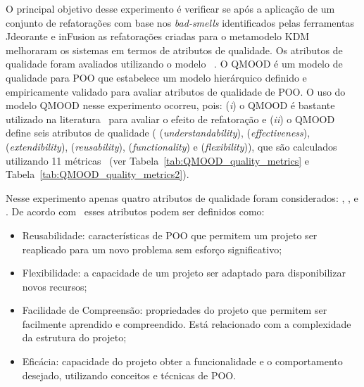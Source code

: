 

O principal objetivo desse experimento é verificar se após a aplicação de um conjunto de refatorações com base nos \textit{bad-smells} identificados pelas ferramentas Jdeorante e inFusion as refatorações criadas para o metamodelo KDM melhoraram os sistemas em termos de atributos de qualidade. Os atributos de qualidade foram avaliados utilizando o modelo ~\cite{Bansiya_QMOOD}. O QMOOD é um modelo de qualidade para POO que estabelece um modelo hierárquico definido e empiricamente validado para avaliar atributos de qualidade de POO. O uso do modelo QMOOD nesse experimento ocorreu, pois: (\textit{i}) o QMOOD é bastante utilizado na literatura~\cite{Keeffe_2008, Seng_2006, Jensen_2010} para avaliar o efeito de refatoração e (\textit{ii}) o QMOOD define seis atributos de qualidade ( (\textit{understandability}),  (\textit{effectiveness}),  (\textit{extendibility}),  (\textit{reusability}),  (\textit{functionality}) e  (\textit{flexibility})), que são calculados utilizando 11 métricas~\cite{Bansiya_QMOOD} (ver Tabela~\ref{tab:QMOOD_quality_metrics} e Tabela~\ref{tab:QMOOD_quality_metrics2}). 


Nesse experimento apenas quatro atributos de qualidade foram considerados: , ,  e . De acordo com~ esses atributos podem ser definidos como: 

\begin{itemize}
\item Reusabilidade: características de POO que permitem um projeto ser reaplicado para um novo problema sem esforço significativo;
\item Flexibilidade: a capacidade de um projeto ser adaptado para disponibilizar novos recursos;
\item Facilidade de Compreensão: propriedades do projeto que permitem ser facilmente aprendido e compreendido. Está relacionado com a complexidade da estrutura do projeto;
\item Eficácia: capacidade do projeto obter a funcionalidade e o comportamento desejado, utilizando conceitos e técnicas de POO.
\end{itemize}


